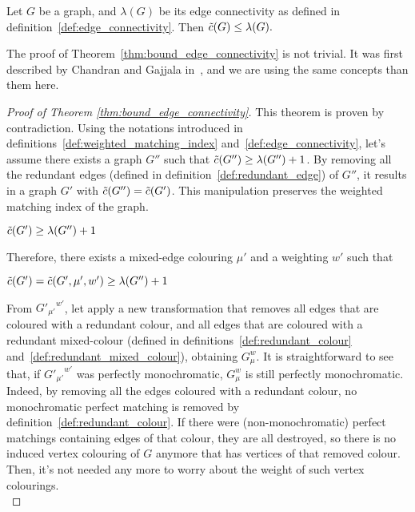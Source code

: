 \begin{theorem}
    \label{thm:bound_edge_connectivity}
    Let $G$ be a graph, and $\lambda(G)$ be its edge connectivity as defined in definition~\ref{def:edge_connectivity}.
    Then $\Tilde{c}(G) \leq \lambda(G).$
\end{theorem}

The proof of Theorem~\ref{thm:bound_edge_connectivity} is not trivial.
It was first described by Chandran and Gajjala in~\cite{chandran}, and we are using the same concepts than them here.   %


\begin{proof}[Proof of Theorem \ref{thm:bound_edge_connectivity}]
    This theorem is proven by contradiction.
    Using the notations introduced in definitions~\ref{def:weighted_matching_index} and~\ref{def:edge_connectivity}, let's assume there exists a graph $G''$ such that $\Tilde{c}(G'') \geq \lambda(G'') + 1$.
    By removing all the redundant edges (defined in definition~\ref{def:redundant_edge}) of $G''$, it results in a graph $G'$ with $\Tilde{c}(G'') = \Tilde{c}(G')$.
    This manipulation preserves the weighted matching index of the graph.
    
    \begin{center}
        $\Tilde{c}(G') \geq \lambda(G'') + 1$
    \end{center}
    
    Therefore, there exists a mixed-edge colouring $\mu'$ and a weighting $w'$ such that
    
    \begin{center}
        $\Tilde{c}(G') = \Tilde{c}(G', \mu', w') \geq \lambda(G'') + 1$
    \end{center}
    
    From ${G'_{\mu'}}^{w'}$, let apply a new transformation that removes all edges that are coloured with a redundant colour, and all edges that are coloured with a redundant mixed-colour (defined in definitions~\ref{def:redundant_colour} and~\ref{def:redundant_mixed_colour}), obtaining $G_\mu^w$.
    It is straightforward to see that, if ${G'_{\mu'}}^{w'}$ was perfectly monochromatic, $G_\mu^w$ is still perfectly monochromatic.
    Indeed, by removing all the edges coloured with a redundant colour, no monochromatic perfect matching is removed by definition~\ref{def:redundant_colour}.
    If there were (non-monochromatic) perfect matchings containing edges of that colour, they are all destroyed, so there is no induced vertex colouring of $G$ anymore that has vertices of that removed colour.   %
    Then, it's not needed any more to worry about the weight of such vertex colourings. \\
    

\end{proof}

